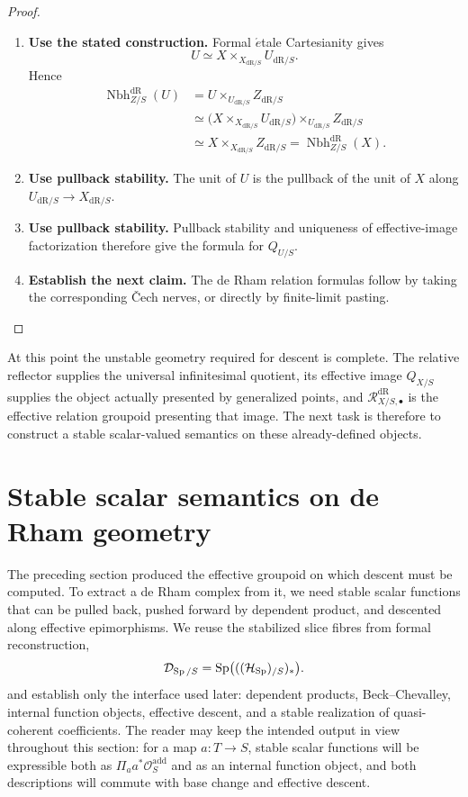 \begin{proof}
\leavevmode
\begin{enumerate}[label=\textup{(\arabic*)}]
    \item \textbf{Use the stated construction.}
    Formal \(\acute{e}\)tale Cartesianity gives
    \[
    U
    \simeq
    X\times_{X_{\mathrm{dR}/S}}U_{\mathrm{dR}/S}.
    \]
    Hence
    \[
    \begin{aligned}
    \operatorname{Nbh}^{\mathrm{dR}}_{Z/S}(U)
    &=
    U\times_{U_{\mathrm{dR}/S}}Z_{\mathrm{dR}/S}\\
    &\simeq
    \bigl(X\times_{X_{\mathrm{dR}/S}}U_{\mathrm{dR}/S}\bigr)
    \times_{U_{\mathrm{dR}/S}}Z_{\mathrm{dR}/S}\\
    &\simeq
    X\times_{X_{\mathrm{dR}/S}}Z_{\mathrm{dR}/S}
    =
    \operatorname{Nbh}^{\mathrm{dR}}_{Z/S}(X).
    \end{aligned}
    \]
    \item \textbf{Use pullback stability.}
    The unit of \(U\) is the pullback of the unit of \(X\) along
    \(U_{\mathrm{dR}/S}\to X_{\mathrm{dR}/S}\).
    \item \textbf{Use pullback stability.}
    Pullback stability and uniqueness
    of effective-image factorization therefore give the formula for \(Q_{U/S}\).
    \item \textbf{Establish the next claim.}
    The
    de Rham relation formulas follow by taking the corresponding \v{C}ech nerves, or directly
    by finite-limit pasting.
\end{enumerate}
\end{proof}


At this point the unstable geometry required for descent is complete. The
relative reflector supplies the universal infinitesimal quotient, its
effective image \(Q_{X/S}\) supplies the object actually presented by
generalized points, and
\(\mathcal R^{\mathrm{dR}}_{X/S,\bullet}\) is the effective relation groupoid
presenting that image. The next task is therefore to construct a stable
scalar-valued semantics on these already-defined objects.
\section{Stable scalar semantics on de Rham geometry}
\label{sec:de-Rham-stable-hyperdoctrine}

The preceding section produced the effective groupoid on which descent must
be computed. To extract a de Rham complex from it, we need stable scalar
functions that can be pulled back, pushed forward by dependent product, and
descented along effective epimorphisms. We reuse the stabilized slice fibres
from formal reconstruction,
\[
  \mathcal D_{\operatorname{Sp}/S}
  =
  \operatorname{Sp}\bigl(((\mathcal H_{\operatorname{Sp}})_{/S})_*\bigr).
\]
and establish only the interface used later: dependent products,
Beck--Chevalley, internal function objects, effective descent, and a stable
realization of quasi-coherent coefficients. The reader may keep the intended
output in view throughout this section: for a map \(a:T\to S\), stable scalar
functions will be expressible both as \(\Pi_a a^*\mathcal O_S^{\mathrm{add}}\)
and as an internal function object, and both descriptions will commute with
base change and effective descent.

